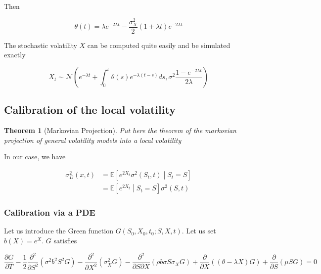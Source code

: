 \documentclass{article}
\newtheorem{theorem}{Theorem}[section]
\begin{document}
\noindent Then

\begin{equation}
	\theta(t) = \lambda e^{-2\lambda t} -\frac{\sigma_X^2}{2} (1 + \lambda t) e^{-2\lambda t}
\end{equation}

The stochastic volatility $X$ can be computed quite easily and be simulated exactly

\begin{equation}
	X_t \sim \mathcal{N}\left(e^{-\lambda t} + \int_0^t \theta(s) e^{-\lambda (t-s)} ds, \sigma^2 \frac{1 - e^{-2\lambda t}}{2\lambda}\right)
\end{equation}

\subsection{Calibration of the local volatility}

\begin{theorem}[Markovian Projection]
Put here the theorem of the markovian projection of general volatility models into a local volatility
\end{theorem}

\noindent In our case, we have

\begin{equation}
\begin{aligned}
	\sigma_D^2(x, t) &= \mathbb{E} \left[ e^{2X_t} \sigma^2(S_t, t) \middle| S_t = S\right]\\
	&= \mathbb{E}\left[e^{2X_t} \middle| S_t = S \right] \sigma^2(S,t)
\end{aligned}
\end{equation}

\subsubsection{Calibration via a PDE}
\noindent Let us introduce the Green function $G(S_0, X_0, t_0 ; S, X, t)$.  Let us set $b(X) = e^{X}$. $G$ satisfies

\begin{equation}
	\frac{\partial G}{\partial T} 
- \frac{1}{2} \frac{\partial^2}{\partial S^2} \left(\sigma^2 b^2 S^2 G\right) 
- \frac{\partial^2}{\partial X^2} \left( \sigma_X^2 G\right) 
- \frac{\partial^2}{\partial S \partial X} \left(\rho b \sigma S \sigma_X G \right) 
+ \frac{\partial }{\partial X}\left( (\theta - \lambda X) G\right) 
+ \frac{\partial }{\partial S}(\mu S G)
 = 0
\end{equation}
\end{document}
